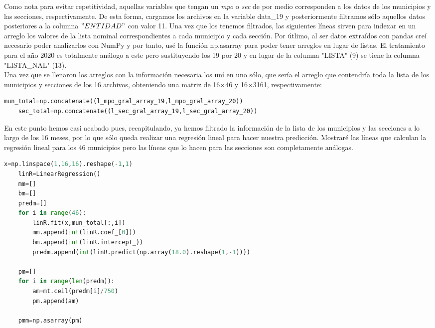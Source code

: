 \documentclass[12pt,letterpaper]{article}
\begin{document}
\normalsize{Como nota para evitar repetitividad, aquellas variables que tengan un \textit{mpo} o \textit{sec} de por medio corresponden a los datos de los municipios y las secciones, respectivamente. De esta forma, cargamos los archivos en la variable data\_19 y posteriormente filtramos sólo aquellos datos posteriores a la columna $"ENTIDAD"$ con valor 11. Una vez que los tenemos filtrados, las siguientes líneas sirven para indexar en un arreglo los valores de la lista nominal correspondientes a cada municipio y cada sección. Por útlimo, al ser datos extraídos con pandas creí necesario poder analizarlos con NumPy y por tanto, usé la función np.asarray para poder tener arreglos en lugar de listas. El tratamiento para el año 2020 es totalmente análogo a este pero sustituyendo los 19 por 20 y en lugar de la columna "LISTA" (9) se tiene la columna "LISTA\_NAL" (13).\\

Una vez que se llenaron los arreglos con la información necesaria los uní en uno sólo, que sería el arreglo que contendría toda la lista de los municipios y secciones de los 16 archivos, obteniendo una matriz de 16$\times$46 y 16$\times$3161, respectivamente:} 
\scriptsize{\begin{lstlisting}[language=Python]
    mun_total=np.concatenate((l_mpo_gral_array_19,l_mpo_gral_array_20))
    sec_total=np.concatenate((l_sec_gral_array_19,l_sec_gral_array_20))
\end{lstlisting}}
\normalsize{En este punto hemos casi acabado pues, recapitulando, ya hemos filtrado la información de la lista de los municipios y las secciones a lo largo de los 16 meses, por lo que sólo queda realizar una regresión lineal para hacer nuestra predicción. Mostraré las líneas que calculan la regresión lineal para los 46 municipios pero las líneas que lo hacen para las secciones son completamente análogas.}
\scriptsize{\begin{lstlisting}[language=Python]
    x=np.linspace(1,16,16).reshape(-1,1)
    linR=LinearRegression()
    mm=[]
    bm=[]
    predm=[]
    for i in range(46):
        linR.fit(x,mun_total[:,i])
        mm.append(int(linR.coef_[0]))
        bm.append(int(linR.intercept_))
        predm.append(int(linR.predict(np.array(18.0).reshape(1,-1))))
    
    pm=[]
    for i in range(len(predm)):
        am=mt.ceil(predm[i]/750)
        pm.append(am)
        
    pmm=np.asarray(pm)
\end{lstlisting}}
\end{document}
